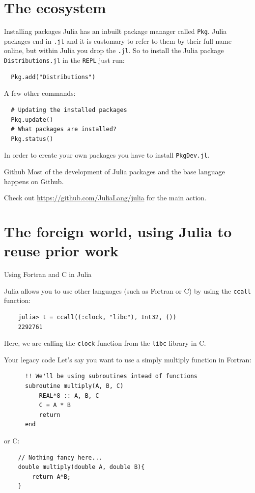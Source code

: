 \documentclass{beamer}
\begin{document}
\section{The ecosystem}
\begin{frame}[fragile]{Installing packages}
  Julia has an inbuilt package manager called \verb|Pkg|. Julia packages end in \verb|.jl|
  and it is customary to refer to them by their full name online, but within Julia you drop the \verb|.jl|.
  So to install the Julia package \verb|Distributions.jl| in the \verb|REPL| just run:

  \begin{Verbatim}
  Pkg.add("Distributions")
  \end{Verbatim}

  A few other commands:
  \begin{Verbatim}
  # Updating the installed packages
  Pkg.update() 
  # What packages are installed?
  Pkg.status()
  \end{Verbatim}
  In order to create your own packages you have to install \verb|PkgDev.jl|.
\end{frame}
\begin{frame}{Github}
  Most of the development of Julia packages and the base language happens on Github.

  Check out \url{https://github.com/JuliaLang/julia} for the main action.
\end{frame}
\section{The foreign world, using Julia to reuse prior work}

\begin{frame}[fragile]{Using Fortran and C in Julia}

Julia allows you to use other languages (such as Fortran or C) by using the \texttt{ccall} function:

\begin{Verbatim}
    julia> t = ccall((:clock, "libc"), Int32, ())
    2292761
\end{Verbatim}

Here, we are calling the \texttt{clock} function from the \texttt{libc} library in C.

\end{frame}

\begin{frame}[fragile]{Your legacy code}
Let's say you want to use a simply multiply function in Fortran:
\begin{Verbatim}
      !! We'll be using subroutines intead of functions 
      subroutine multiply(A, B, C)
          REAL*8 :: A, B, C
          C = A * B
          return
      end
\end{Verbatim}
\vspace{0.5cm}
or C:
\begin{Verbatim}
    // Nothing fancy here...
    double multiply(double A, double B){
        return A*B;
    }
\end{Verbatim}
\end{frame}
\end{document}
